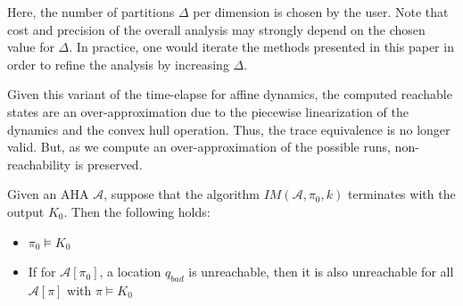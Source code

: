 \documentclass{llncs}
\newcommand{\IM}{\ensuremath{\mathit{IM}}}
\newcommand{\A}{\ensuremath{\mathcal{A}}}
\begin{document}
Here, the number of partitions $\Delta$ per dimension is chosen by the
user. Note that cost and precision of the overall analysis may
strongly depend on the chosen value for $\Delta$. In practice, one
would iterate the methods presented in this paper in order to refine
the analysis by increasing $\Delta$.

Given this variant of the time-elapse for affine dynamics, the
computed reachable states are an over-approximation due to the
piecewise linearization of the dynamics and the convex hull
operation. Thus, the trace equivalence is no longer
valid. But, as we compute an over-approximation of the possible runs,
non-reachability is preserved. 
\begin{proposition}
  Given an AHA $\A$, suppose that the algorithm $\IM(\A, \pi_0, k)$
  terminates with the output $K_0$. Then the following holds:
  \begin{itemize}
  \item $\pi_0 \models K_0$
  \item If for $\A[\pi_0]$, a location $q_{bad}$ is unreachable, then
  it is also unreachable for all $\A[\pi]$ with $\pi \models K_0$      
  \end{itemize}
\end{proposition}
\end{document}
